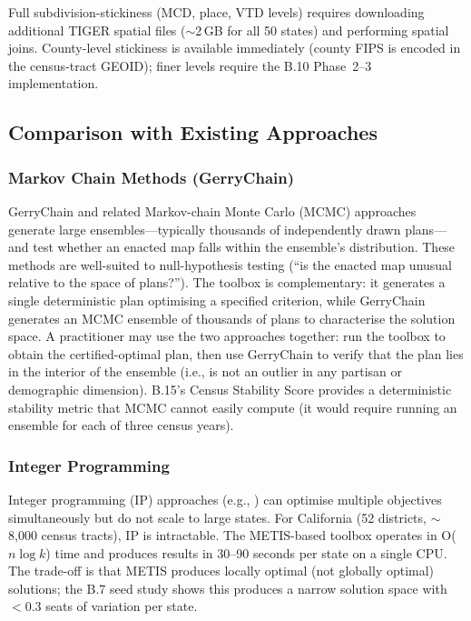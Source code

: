 Full subdivision-stickiness (MCD, place, VTD levels) requires downloading
additional TIGER spatial files ($\sim$2\,GB for all 50 states) and performing
spatial joins.
County-level stickiness is available immediately (county FIPS is encoded in the
census-tract GEOID); finer levels require the B.10 Phase~2--3 implementation.

\subsection{Comparison with Existing Approaches}

\subsubsection*{Markov Chain Methods (GerryChain)}

GerryChain \citep{metric2018} and related Markov-chain Monte Carlo (MCMC) approaches
generate large ensembles---typically thousands of independently drawn plans---and test
whether an enacted map falls within the ensemble's distribution.
These methods are well-suited to null-hypothesis testing (``is the enacted map
unusual relative to the space of plans?'').
The toolbox is complementary: it generates a single deterministic plan optimising
a specified criterion, while GerryChain generates an MCMC ensemble of thousands of
plans to characterise the solution space.
A practitioner may use the two approaches together: run the toolbox to obtain the
certified-optimal plan, then use GerryChain to verify that the plan lies in the
interior of the ensemble (i.e., is not an outlier in any partisan or demographic dimension).
B.15's Census Stability Score provides a deterministic stability metric that
MCMC cannot easily compute (it would require running an ensemble for each of
three census years).

\subsubsection*{Integer Programming}

Integer programming (IP) approaches (e.g., \citet{gurnee2021}) can optimise
multiple objectives simultaneously but do not scale to large states.
For California (52 districts, $\sim$8,000 census tracts), IP is intractable.
The METIS-based toolbox operates in O($n \log k$) time and produces results
in 30--90 seconds per state on a single CPU.
The trade-off is that METIS produces locally optimal (not globally optimal)
solutions; the B.7 seed study shows this produces a narrow solution space
with $< 0.3$ seats of variation per state.

